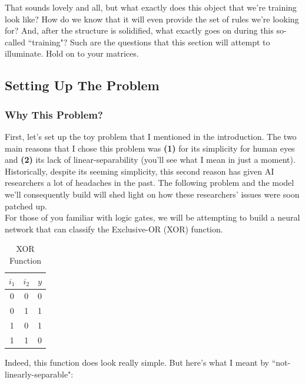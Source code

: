 \documentclass{article}
\begin{document}
That sounds lovely and all, but what exactly does this object that we're training look like? How do we know that it will even provide the set of rules we're looking for? And, after the structure is solidified, what exactly goes on during this so-called ``training"? Such are the questions that this section will attempt to illuminate. Hold on to your matrices.

\subsection{Setting Up The Problem}

\subsubsection{Why This Problem?}
First, let's set up the toy problem that I mentioned in the introduction. The two main reasons that I chose this problem was \textbf{(1)} for its simplicity for human eyes and \textbf{(2)} its lack of linear-separability (you'll see what I mean in just a moment). Historically, despite its seeming simplicity, this second reason has given AI researchers a lot of headaches in the past. The following problem and the model we'll consequently build will shed light on how these researchers' issues were soon patched up.\\

For those of you familiar with logic gates, we will be attempting to build a neural network that can classify the Exclusive-OR (XOR) function.

\begin{table}[hbt!]
    \centering
    \begin{tabular}{c|c|c}
       $i_1$ & $i_2$ & $y$ \\
       \hline
       0  &  0 & 0  \\
       0  &  1 & 1  \\
       1  &  0 & 1  \\
       1  &  1 & 0  \\
    \end{tabular}
    \caption{XOR Function}
    \label{tab:my_label}
\end{table}
Indeed, this function does look really simple. But here's what I meant by ``not-linearly-separable":
\end{document}
